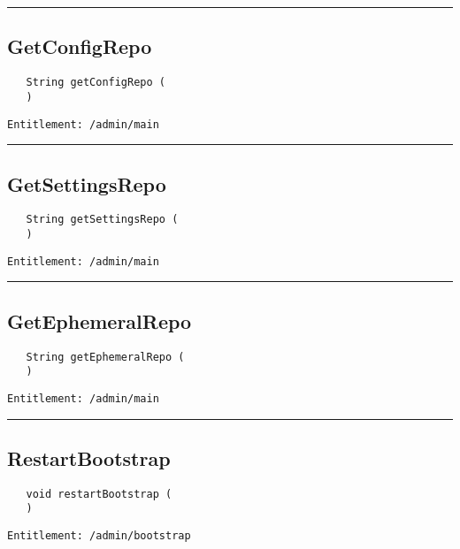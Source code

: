 \rule{12cm}{2pt}
\subsection{GetConfigRepo}
\label{Api:GetConfigRepo}
\begin{verbatim}
   String getConfigRepo (
   )
\end{verbatim}
\begin{Verbatim}[fontsize=\small, formatcom=\color{Maroon}]
  Entitlement: /admin/main
\end{Verbatim}



\rule{12cm}{2pt}
\subsection{GetSettingsRepo}
\label{Api:GetSettingsRepo}
\begin{verbatim}
   String getSettingsRepo (
   )
\end{verbatim}
\begin{Verbatim}[fontsize=\small, formatcom=\color{Maroon}]
  Entitlement: /admin/main
\end{Verbatim}



\rule{12cm}{2pt}
\subsection{GetEphemeralRepo}
\label{Api:GetEphemeralRepo}
\begin{verbatim}
   String getEphemeralRepo (
   )
\end{verbatim}
\begin{Verbatim}[fontsize=\small, formatcom=\color{Maroon}]
  Entitlement: /admin/main
\end{Verbatim}



\rule{12cm}{2pt}
\subsection{RestartBootstrap}
\label{Api:RestartBootstrap}
\begin{verbatim}
   void restartBootstrap (
   )
\end{verbatim}
\begin{Verbatim}[fontsize=\small, formatcom=\color{Maroon}]
  Entitlement: /admin/bootstrap
\end{Verbatim}



